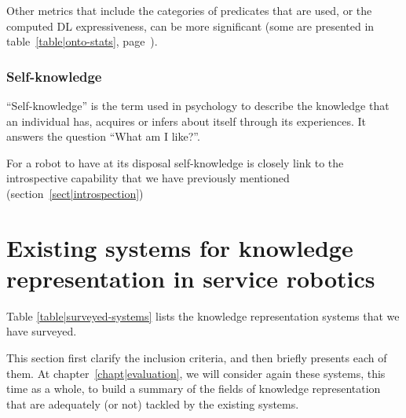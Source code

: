 Other metrics that include the categories of predicates that are used, or the
computed DL expressiveness, can be more significant (some are presented in
table~\ref{table|onto-stats}, page~\pageref{table|onto-stats}).

\subsubsection{Self-knowledge}

``Self-knowledge'' is the term used in psychology to describe the knowledge
that an individual has, acquires or infers about itself through its
experiences. It answers the question ``What am I like?''.

For a robot to have at its disposal self-knowledge is closely link to the
introspective capability that we have previously mentioned
(section~\ref{sect|introspection})


\section{Existing systems for knowledge representation in service robotics}
\label{sect|surveyed-systems}


Table \ref{table|surveyed-systems} lists the knowledge representation
systems that we have surveyed.

This section first clarify the inclusion criteria, and then briefly presents
each of them. At chapter~\ref{chapt|evaluation}, we will consider again these
systems, this time as a whole, to build a summary of the fields of knowledge
representation that are adequately (or not) tackled by the existing systems.

